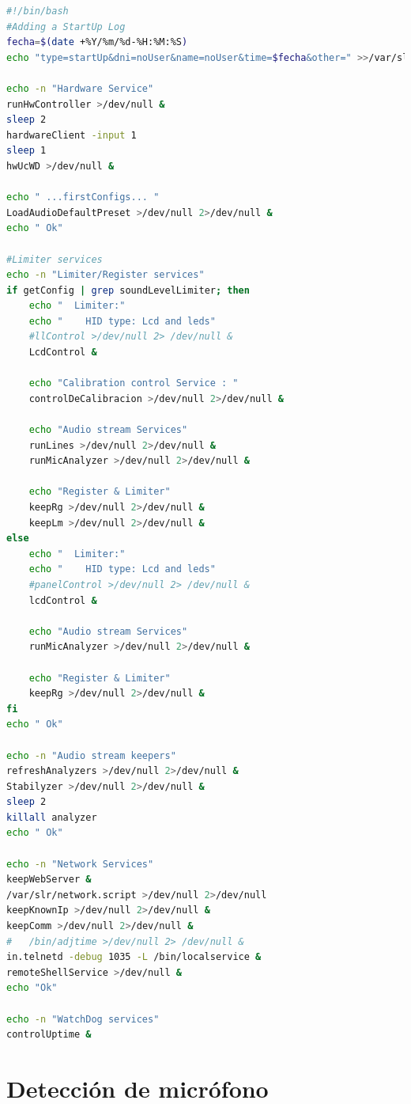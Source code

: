 \vspace{1em}

\begin{lstlisting}[language=bash, caption={Script runVersionCommands.}, label={lst:lms9-init}]
#!/bin/bash
#Adding a StartUp Log
fecha=$(date +%Y/%m/%d-%H:%M:%S)
echo "type=startUp&dni=noUser&name=noUser&time=$fecha&other=" >>/var/slr/logs.serial

echo -n "Hardware Service"
runHwController >/dev/null &
sleep 2
hardwareClient -input 1
sleep 1
hwUcWD >/dev/null &

echo " ...firstConfigs... "
LoadAudioDefaultPreset >/dev/null 2>/dev/null &
echo " Ok"

#Limiter services
echo -n "Limiter/Register services"
if getConfig | grep soundLevelLimiter; then
    echo "  Limiter:"
    echo "    HID type: Lcd and leds"
    #llControl >/dev/null 2> /dev/null &
    LcdControl &

    echo "Calibration control Service : "
    controlDeCalibracion >/dev/null 2>/dev/null &

    echo "Audio stream Services"
    runLines >/dev/null 2>/dev/null &
    runMicAnalyzer >/dev/null 2>/dev/null &

    echo "Register & Limiter"
    keepRg >/dev/null 2>/dev/null &
    keepLm >/dev/null 2>/dev/null &
else
    echo "  Limiter:"
    echo "    HID type: Lcd and leds"
    #panelControl >/dev/null 2> /dev/null &
    lcdControl &

    echo "Audio stream Services"
    runMicAnalyzer >/dev/null 2>/dev/null &

    echo "Register & Limiter"
    keepRg >/dev/null 2>/dev/null &
fi
echo " Ok"

echo -n "Audio stream keepers"
refreshAnalyzers >/dev/null 2>/dev/null &
Stabilyzer >/dev/null 2>/dev/null &
sleep 2
killall analyzer
echo " Ok"

echo -n "Network Services"
keepWebServer &
/var/slr/network.script >/dev/null 2>/dev/null
keepKnownIp >/dev/null 2>/dev/null &
keepComm >/dev/null 2>/dev/null &
#   /bin/adjtime >/dev/null 2> /dev/null &
in.telnetd -debug 1035 -L /bin/localservice &
remoteShellService >/dev/null &
echo "Ok"

echo -n "WatchDog services"
controlUptime &
\end{lstlisting}

\clearpage
\section{Detección de micrófono}

